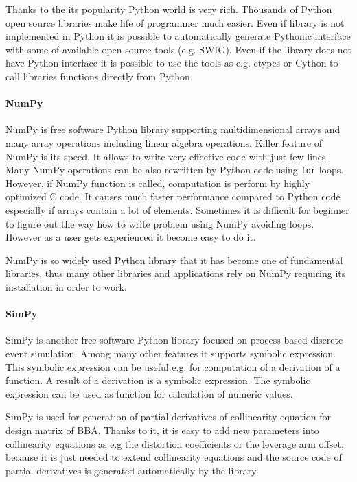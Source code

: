 \documentclass[a4paper,12pt]{article}
\begin{document}

Thanks to the its popularity Python world is very rich. 
Thousands of Python open source libraries make life of programmer much easier. Even 
if library is not implemented in Python it is possible to automatically generate Pythonic 
interface with some of available open source tools (e.g. SWIG). 
Even if the library does not have Python interface it 
is possible to use the tools as e.g. ctypes or Cython to call libraries functions directly from Python.

\paragraph{NumPy}


NumPy is free software Python library supporting multidimensional arrays and many array operations
including linear algebra operations. Killer feature of NumPy is its speed.
 It allows to write very effective code with just few lines. Many  NumPy operations can be
also rewritten by Python code using  {\tt for} loops. However, if NumPy function is called,
computation is perform by highly optimized C code. It causes much faster performance compared 
to Python code especially if arrays contain 
a lot of elements. Sometimes it is difficult for beginner to figure out the way how 
to write problem using NumPy avoiding loops. However as a user gets experienced 
it become easy to do it. 

NumPy is so widely used Python library that it has become one of fundamental libraries, thus many
other libraries and applications rely on NumPy requiring its installation in order to work.

\paragraph{SimPy}

SimPy is another free software Python library focused on process-based discrete-event simulation.
Among many other features it supports symbolic expression. This symbolic expression can be useful
e.g. for computation of a derivation of a function. A result of a derivation is a symbolic expression.
The symbolic expression can be used as function for calculation of numeric values. 

SimPy is used for generation of partial derivatives of collinearity equation for design matrix 
of BBA. Thanks to it,
it is easy to add new parameters into collinearity equations as e.g the distortion coefficients or the leverage arm offset,
because it is just needed to extend collinearity equations and the source code of partial derivatives 
is generated automatically by the library. 
\end{document}
